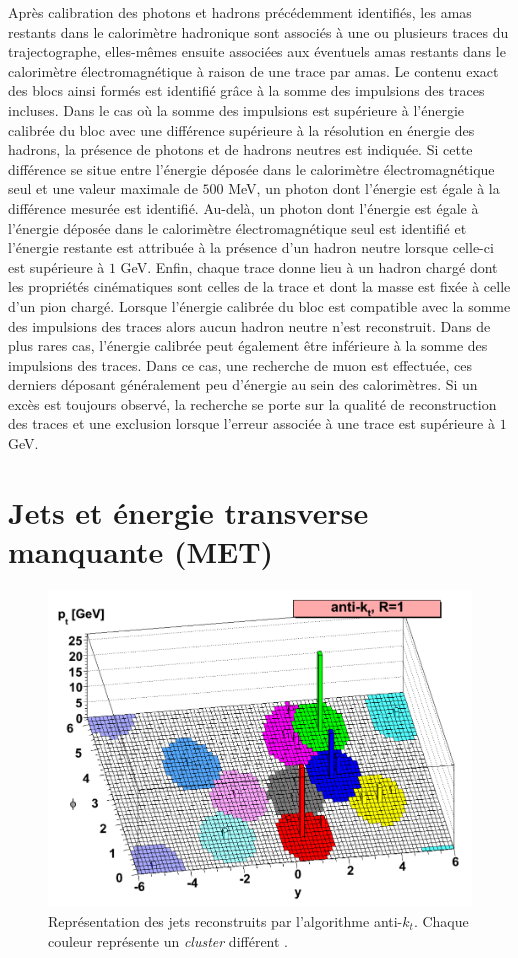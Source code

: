 Après calibration des photons et hadrons précédemment identifiés, les amas restants dans le calorimètre hadronique sont associés à une ou plusieurs traces du trajectographe, elles-mêmes ensuite associées aux éventuels amas restants dans le calorimètre électromagnétique à raison de une trace par amas. Le contenu exact des blocs ainsi formés est identifié grâce à la somme des impulsions des traces incluses. Dans le cas où la somme des impulsions est supérieure à l'énergie calibrée du bloc avec une différence supérieure à la résolution en énergie des hadrons, la présence de photons et de hadrons neutres est indiquée. Si cette différence se situe entre l'énergie déposée dans le calorimètre électromagnétique seul et une valeur maximale de $500$ MeV, un photon dont l'énergie est égale à la différence mesurée est identifié. Au-delà, un photon dont l'énergie est égale à l'énergie déposée dans le calorimètre électromagnétique seul est identifié et l'énergie restante est attribuée à la présence d'un hadron neutre lorsque celle-ci est supérieure à $1$ GeV. Enfin, chaque trace donne lieu à un hadron chargé dont les propriétés cinématiques sont celles de la trace et dont la masse est fixée à celle d'un pion chargé. Lorsque l'énergie calibrée du bloc est compatible avec la somme des impulsions des traces alors aucun hadron neutre n'est reconstruit. Dans de plus rares cas, l'énergie calibrée peut également être inférieure à la somme des impulsions des traces. Dans ce cas, une recherche de muon est effectuée, ces derniers déposant généralement peu d'énergie au sein des calorimètres. Si un excès est toujours observé, la recherche se porte sur la qualité de reconstruction des traces et une exclusion lorsque l'erreur associée à une trace est supérieure à $1$ GeV.

\section{Jets et énergie transverse manquante (MET)}
\label{JetMetID}

\begin{figure}
\centering
    \includegraphics[width=0.6\linewidth]{Chapitre4/Images/antikt.png} 
    \caption{Représentation des jets reconstruits par l'algorithme anti-$k_t$. Chaque couleur représente un \textit{cluster} différent \cite{antikt}.}
    \label{antikt}
\end{figure} 


